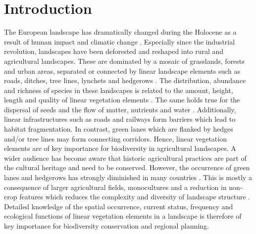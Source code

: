 \section{Introduction}
The European landscape has dramatically changed during the Holocene as a result of human impact and climatic change \citep{turner1989landscape, marquer2017quantifying}. Especially since the industrial revolution, landscapes have been deforested and reshaped into rural and agricultural landscapes. These are dominated by a mosaic of grasslands, forests and urban areas, separated or connected by linear landscape elements such as roads, ditches, tree lines, lynchets and hedgerows \citep{bailly2008agrarian, meyer2012multifunctional, van2013modelling}. The distribution, abundance and richness of species in these landscapes is related to the amount, height, length and quality of linear vegetation elements \citep{aguirre2016functional, spellerberg1999introduction, croxton2005linear}. The same holds true for the dispersal of seeds and the flow of matter, nutrients and water \citep{turner1989landscape, burel1996hedgerows}. Additionally, linear infrastructures such as roads and railways form barriers which lead to habitat fragmentation. In contrast, green lanes which are flanked by hedges and/or tree lines may form connecting corridors. Hence, linear vegetation elements are of key importance for biodiversity in agricultural landscapes. A wider audience has become aware that historic agricultural practices are part of the cultural heritage \citep{jongman2004landscape, gobster2007shared} and need to be conserved. However, the occurrence of  green lanes and hedgerows has strongly diminished in many countries \citep{boutin2001hedgerows, stoate2001ecological}. This is mostly a consequence of larger agricultural fields, monocultures and a reduction in non-crop features which reduces the complexity and diversity of landscape structure \citep{croxton2005linear}. Detailed knowledge of the spatial occurrence, current status, frequency and ecological functions of linear vegetation elements in a landscape is therefore of key importance for biodiversity conservation and regional planning.


